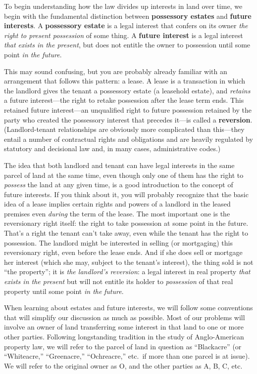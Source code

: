 To begin understanding how the law divides up interests in land over time, we
begin with the fundamental distinction between \textbf{possessory
estates} and \textbf{future interests}. A \textbf{possessory estate}
is a legal interest that confers on its owner \textit{the right to
present possession} of some thing. A \textbf{future interest} is a legal
interest \textit{that exists in the present}, but does not entitle the
owner to possession until some point \textit{in the future}.

This may sound confusing, but you are probably already familiar with an
arrangement that follows this pattern: a lease. A lease is a transaction in
which the landlord gives the tenant a possessory estate (a leasehold estate),
and \textit{retains} a future interest---the right to retake possession after
the lease term ends. This retained future interest---an unqualified right to
future possession retained by the party who created the possessory interest
that precedes it---is called a \textbf{reversion}. (Landlord-tenant
relationships are obviously more complicated than this---they entail a number
of contractual rights and obligations and are heavily regulated by statutory
and decisional law and, in many cases, administrative codes.)

The idea that both landlord and tenant can have legal interests in the same
parcel of land at the same time, even though only one of them has the right to
\textit{possess} the land at any given time, is a good introduction to the
concept of future interests. If you think about it, you will probably recognize
that the basic idea of a lease implies certain rights and powers of a landlord
in the leased premises even \textit{during} the term of the lease. The most
important one is the reversionary right itself: the right to take possession at
some point in the future. That's a right the tenant can't take away, even while
the tenant has the right to possession. The landlord might be interested in
selling (or mortgaging) this reversionary right, even before the lease ends.
And if she does sell or mortgage her interest (which she may, subject to the
tenant's interest), the thing sold is not ``the property''; it is \textit{the
landlord's reversion}: a legal interest in real property \textit{that exists in
the present} but will not entitle its holder to \textit{possession} of that
real property until some point \textit{in the} \textit{future}.

When learning about estates and future interests, we will follow some
conventions that will simplify our discussion as much as possible. Most of our
problems will involve an owner of land transferring some interest in that land
to one or more other parties. Following longstanding tradition in the study of
Anglo-American property law, we will refer to the parcel of land in question as
``Blackacre'' (or ``Whiteacre,'' ``Greenacre,'' ``Ochreacre,'' etc.\ if more
than one parcel is at issue). We will refer to the original owner as O, and the
other parties as A, B, C, etc.

